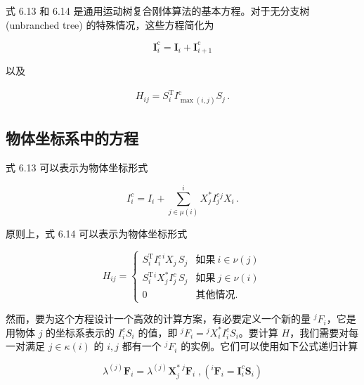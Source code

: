 \documentclass[10pt,a4paper]{book}
\theoremstyle{thmstyle} %
\theoremstyle{defstyle} %
\theoremstyle{prostyle} %
\begin{document}
式 6.13 和 6.14 是通用运动树复合刚体算法的基本方程。对于无分支树 (unbranched tree) 的特殊情况，这些方程简化为



$$
\boldsymbol { I } _ { i } ^{\mathrm { c} } = \boldsymbol { I } _ { i } + \boldsymbol { I } _ { i + 1 } ^{\mathrm { c} }
$$



以及



$$
\begin{array}{r} { H _ { i j } = S _ { i } ^{\mathrm { T} } I _ { \operatorname* { m a x } ( i , j ) } ^{\mathrm { c} } S _ { j } \, . } \end{array}
$$



\subsection{物体坐标系中的方程}





式 6.13 可以表示为物体坐标形式



$$
I _ { i } ^{c} = I _ { i } + \sum _ { j \in \mu ( i ) } ^{i} X _ { j } ^{*} I _ { j } ^{c} { } ^{j} X _ { i } \, .
$$



原则上，式 6.14 可以表示为物体坐标形式



$$
H _ { i j } = \left\{ \begin{array}{ll} { S _ { i } ^{\mathrm { T} } I _ { i } ^{c \, i} X _ { j } \, S _ { j } } & { \text{如果}~ i \in \nu ( j ) } \\{ S _ { i } ^{\mathrm { T} } { } ^{i} X _ { j } ^{*} I _ { j } ^{c} \, S _ { j } } & { \text{如果}~ j \in \nu ( i ) } \\{ 0 } & \text{其他情况} . \end{array} \right.
$$



然而，要为这个方程设计一个高效的计算方案，有必要定义一个新的量 $^{j}F_{i}$，它是用物体 $j$ 的坐标系表示的 $I_{i}^{c}S_{i}$ 的值，即 $^{j}F_{i} = {}^{j}X_{i}^{*}I_{i}^{c}S_{i}$。要计算 $H$，我们需要对每一对满足 $j \in \kappa(i)$ 的 $i,j$ 都有一个 $^{j}F_{i}$ 的实例。它们可以使用如下公式递归计算



$$
\lambda ^{( j )} \boldsymbol{ F } _ { i } = \lambda ^{( j )} \boldsymbol{ X } _ { j } ^{* \; j} \boldsymbol{ F } _ { i } \; ,  \left( ^{i} \boldsymbol{ F } _ { i } = \boldsymbol{ I } _ { i } ^{c} \boldsymbol{ S } _ { i } \right)
$$
\end{document}
